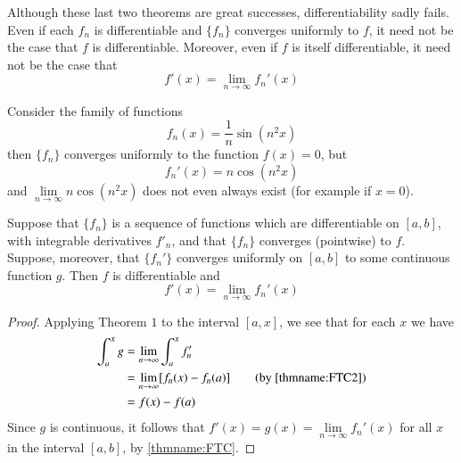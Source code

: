 \begin{remark}
    Although these last two theorems are great successes, differentiability sadly fails. Even if each $f_n$ is differentiable and $\{f_n\}$ converges uniformly to $f$, it need not be the case that $f$ is differentiable. Moreover, even if $f$ is itself differentiable, it need not be the case that \begin{equation*}
        f'(x) = \lim\limits_{n\rightarrow \infty}f_n'(x)
    \end{equation*}
\end{remark}

\begin{example}
    Consider the family of functions \begin{equation*}
        f_n(x) = \frac{1}{n}\sin(n^2x)
    \end{equation*}
    then $\{f_n\}$ converges uniformly to the function $f(x) = 0$, but \begin{equation*}
        f_n'(x) = n\cos(n^2x)
    \end{equation*}
    and $\lim\limits_{n\rightarrow\infty}n\cos(n^2x)$ does not even always exist (for example if $x =0$).
\end{example}


\begin{theorem}
    Suppose that $\{f_n\}$ is a sequence of functions which are differentiable on $[a,b]$, with integrable derivatives $f'_n$, and that $\{f_n\}$ converges (pointwise) to $f$. Suppose, moreover, that $\{f_n'\}$ converges uniformly on $[a,b]$ to some continuous function $g$. Then $f$ is differentiable and \begin{equation*}
        f'(x) = \lim\limits_{n\rightarrow \infty}f_n'(x)
    \end{equation*}
\end{theorem}
\begin{proof}
    Applying Theorem $1$ to the interval $[a,x]$, we see that for each $x$ we have \begin{align*}
        \int_a^xg &= \lim\limits_{n\rightarrow \infty}\int_a^xf'_n \\
        &= \lim\limits_{n\rightarrow \infty}[f_n(x) - f_n(a)] \tag{by \ref{thmname:FTC2}} \\
        &= f(x) - f(a)
    \end{align*}
    Since $g$ is continuous, it follows that $f'(x) = g(x) = \lim\limits_{n\rightarrow \infty}f_n'(x)$ for all $x$ in the interval $[a,b]$, by \ref{thmname:FTC}.
\end{proof}

